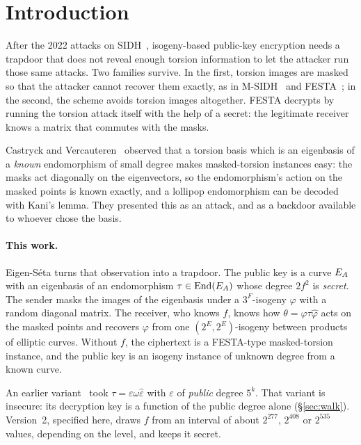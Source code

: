\section{Introduction}\label{sec:intro}

After the 2022 attacks on SIDH~\cite{CD23,MMPPW23,Rob23}, isogeny-based public-key
encryption needs a trapdoor that does not reveal enough torsion information to
let the attacker run those same attacks. Two families
survive. In the first, torsion images are masked so that the attacker cannot
recover them exactly, as in M-SIDH~\cite{FMP23} and FESTA~\cite{BMP23}; in the
second, the scheme avoids torsion images altogether. FESTA decrypts by running
the torsion attack itself with the help of a secret: the legitimate receiver
knows a matrix that commutes with the masks.

Castryck and Vercauteren~\cite{CV23} observed that a torsion basis which is an
eigenbasis of a \emph{known} endomorphism of small degree makes masked-torsion
instances easy: the masks act diagonally on the eigenvectors, so the
endomorphism's action on the masked points is known exactly, and a lollipop
endomorphism can be decoded with Kani's lemma. They presented this as an
attack, and as a backdoor available to whoever chose the basis.

\paragraph{This work.} Eigen-S\'eta turns that observation into a trapdoor. The
public key is a curve $E_A$ with an eigenbasis of an endomorphism
$\tau\in\operatorname{End}(E_A)$ whose degree $2f^2$ is \emph{secret}. The sender masks the
images of the eigenbasis under a $3^F$-isogeny $\varphi$ with a random diagonal
matrix. The receiver, who knows $f$, knows how
$\theta=\varphi\tau\hat\varphi$ acts on the masked points and recovers $\varphi$
from one $(2^E,2^E)$-isogeny between products of elliptic curves. Without $f$,
the ciphertext is a FESTA-type masked-torsion instance, and the public key is
an isogeny instance of unknown degree from a known curve.

An earlier variant~\cite{EigenSetaNote} took $\tau=\varepsilon\omega\hat\varepsilon$
with $\varepsilon$ of \emph{public} degree $5^k$. That variant is insecure:
its decryption key is a function of the public degree alone
(\S\ref{sec:walk}). Version~2, specified here, draws $f$ from an interval of
about $2^{277}$, $2^{408}$ or $2^{535}$ values, depending on the level, and keeps it secret.

